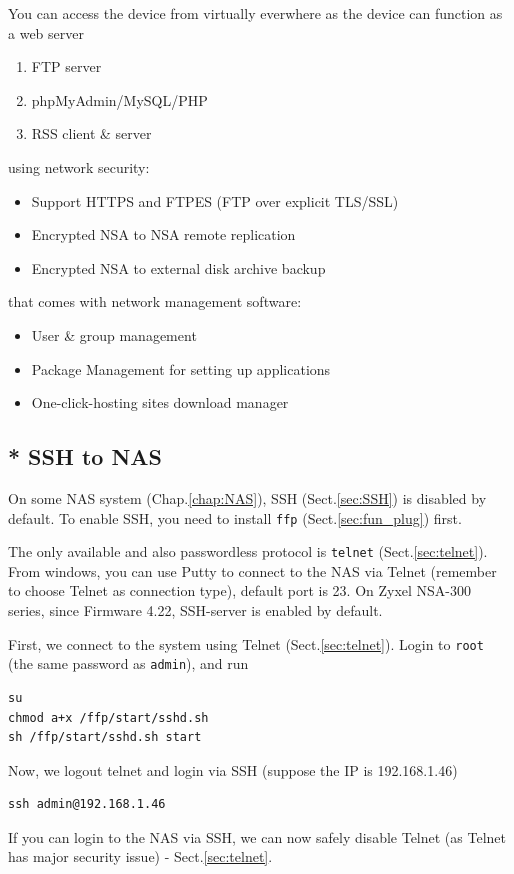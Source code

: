 You can access the device from virtually everwhere as the device can function as
a web server
\begin{enumerate}
  \item FTP server
  \item  phpMyAdmin/MySQL/PHP
  \item  RSS client \& server
\end{enumerate}
using network security: 
\begin{itemize}
\item  Support HTTPS and FTPES (FTP over explicit TLS/SSL)
\item  Encrypted NSA to NSA remote replication
\item  Encrypted NSA to external disk archive backup
\end{itemize}
that comes with network management software: 
\begin{itemize}
  \item User \& group management
\item  Package Management for setting up applications
\item  One-click-hosting sites download manager
\end{itemize}

\subsection{* SSH to NAS}
\label{sec:enable-SSH}

On some NAS system (Chap.\ref{chap:NAS}), SSH (Sect.\ref{sec:SSH}) is disabled
by default. To enable SSH, you need to install \verb!ffp!
(Sect.\ref{sec:fun_plug}) first.

The only available and also passwordless protocol is \verb!telnet!
(Sect.\ref{sec:telnet}). From windows, you can use Putty to connect to the NAS
via Telnet (remember to choose Telnet as connection type), default port is 23.
On Zyxel NSA-300 series, since Firmware 4.22, SSH-server is enabled by default.

First, we connect to the system using Telnet (Sect.\ref{sec:telnet}). Login to
\verb!root! (the same password as \verb!admin!), and run
\begin{verbatim}
su
chmod a+x /ffp/start/sshd.sh
sh /ffp/start/sshd.sh start
\end{verbatim}

Now, we logout telnet and login via SSH (suppose the IP is 192.168.1.46)
\begin{verbatim}
ssh admin@192.168.1.46
\end{verbatim}
If you can login to the NAS via SSH, we can now safely disable Telnet (as Telnet
has major security issue) - Sect.\ref{sec:telnet}.


